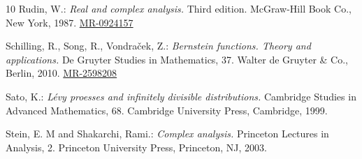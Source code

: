 \documentclass[12pt,a4paper]{amsart}
\def\MR#1{\href{http://www.ams.org/mathscinet-getitem?mr=#1}{MR-#1}}
\theoremstyle{plain}
\theoremstyle{definition}
\numberwithin{equation}{section}
\begin{document}
\begin{thebibliography} {10}
Rudin, W.:
\emph{Real and complex analysis.}
Third edition. McGraw-Hill Book Co., New York, 1987.
\MR{0924157}

Schilling, R., Song, R., Vondra\v{c}ek, Z.:
\emph{Bernstein functions. Theory and applications.}
De Gruyter Studies in Mathematics, 37. Walter de Gruyter \& Co., Berlin, 2010.
\MR{2598208}

Sato, K.:
\emph{L\'evy proesses and infinitely divisible distributions.}
Cambridge Studies in Advanced Mathematics, 68. Cambridge University Press, Cambridge, 1999.

Stein, E. M and Shakarchi, Rami.:
\emph{Complex analysis.}
Princeton Lectures in Analysis, 2. Princeton University Press, Princeton, NJ, 2003.

\end{thebibliography}
\end{document}
